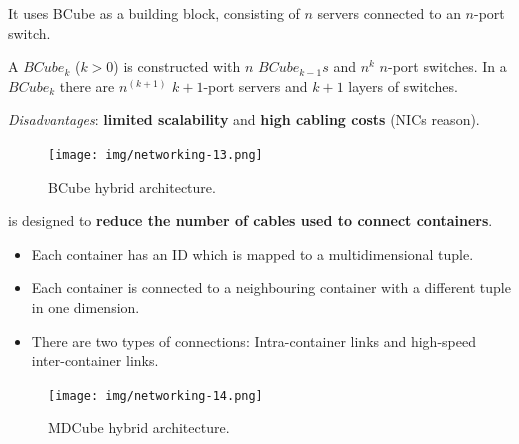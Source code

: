 \highspace
It uses BCube as a building block, consisting of $n$ servers connected to an $n$-port switch.

\highspace
A $BCube_{k}$ ($k>0$) is constructed with $n$ $BCube_{k-1}s$ and $n^{k}$ $n$-port switches. In a $BCube_{k}$ there are $n^{\left(k+1\right)}$ $k+1$-port servers and $k+1$ layers of switches.

\highspace
\emph{Disadvantages}: \textbf{limited scalability} and \textbf{high cabling costs} (NICs reason).

\begin{figure}[!htp]
    \centering
    \texttt{[image: img/networking-13.png]}
    \caption{BCube hybrid architecture.}
\end{figure}

\newpage

\noindent
{} is designed to \textbf{reduce the number of cables used to connect containers}. 
\begin{itemize}
    \item Each container has an ID which is mapped to a multidimensional tuple.
    \item Each container is connected to a neighbouring container with a different tuple in one dimension.
    \item There are two types of connections: Intra-container links and high-speed inter-container links.
\end{itemize}

\begin{figure}[!htp]
    \centering
    \texttt{[image: img/networking-14.png]}
    \caption{MDCube hybrid architecture.}
\end{figure}